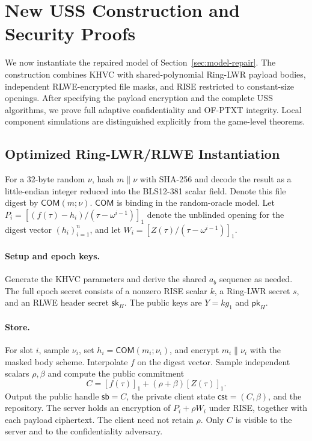 \section{New USS Construction and Security Proofs}
\label{sec:uss}

We now instantiate the repaired model of Section~\ref{sec:model-repair}. The construction combines KHVC with shared-polynomial Ring-LWR payload bodies, independent RLWE-encrypted file masks, and RISE restricted to constant-size openings. After specifying the payload encryption and the complete USS algorithms, we prove full adaptive confidentiality and OF-PTXT integrity. Local component simulations are distinguished explicitly from the game-level theorems.



\subsection{Optimized Ring-LWR/RLWE Instantiation}
\label{sec:optimized-uss}

For a 32-byte random $\nu$, hash $m\parallel\nu$ with SHA-256 and decode the result as a little-endian integer reduced into the BLS12-381 scalar field. Denote this file digest by $\mathsf{COM}(m;\nu)$. $\mathsf{COM}$ is binding in the random-oracle model. Let $P_i=[(f(\tau)-h_i)/(\tau-\omega^{i-1})]_1$ denote the unblinded opening for the digest vector $(h_i)_{i=1}^n$, and let $W_i=[Z(\tau)/(\tau-\omega^{i-1})]_1$.

\paragraph{Setup and epoch keys.}
Generate the KHVC parameters and derive the shared $a_b$ sequence as needed. The full epoch secret consists of a nonzero RISE scalar $k$, a Ring-LWR secret $s$, and an RLWE header secret $\mathsf{sk}_H$. The public keys are $Y=kg_1$ and $\mathsf{pk}_H$.

\paragraph{Store.}
For slot $i$, sample $\nu_i$, set $h_i=\mathsf{COM}(m_i;\nu_i)$, and encrypt $m_i\parallel\nu_i$ with the masked body scheme. Interpolate $f$ on the digest vector. Sample independent scalars $\rho,\beta$ and compute the public commitment
\[
 C=[f(\tau)]_1+(\rho+\beta)[Z(\tau)]_1 .
\]
Output the public handle $\mathsf{sb}=C$, the private client state $\mathsf{cst}=(C,\beta)$, and the repository. The server holds an encryption of $P_i+\rho W_i$ under RISE, together with each payload ciphertext. The client need not retain $\rho$. Only $C$ is visible to the server and to the confidentiality adversary.

